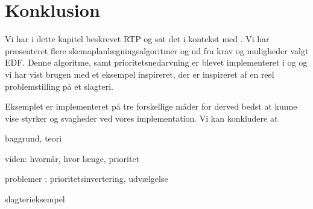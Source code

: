 \section{Konklusion}
Vi har i dette kapitel beskrevet RTP og sat det i kontekst med \pycsp. Vi har præsenteret flere skemaplanlægningsalgoritmer og ud fra krav og muligheder valgt EDF. Denne algoritme, samt prioritetsnedarvning er blevet implementeret i \pycsp og og vi har vist brugen med et eksempel inspireret, der er inspireret af en reel problemstilling på et slagteri. 

Eksemplet er implementeret på tre forskellige måder for derved bedst at kunne vise styrker og svagheder ved vores implementation. Vi kan konkludere at 

baggrund, teori

viden: hvornår, hvor længe, prioritet


problemer : prioritetsinvertering, udvælgelse

slagterieksempel





